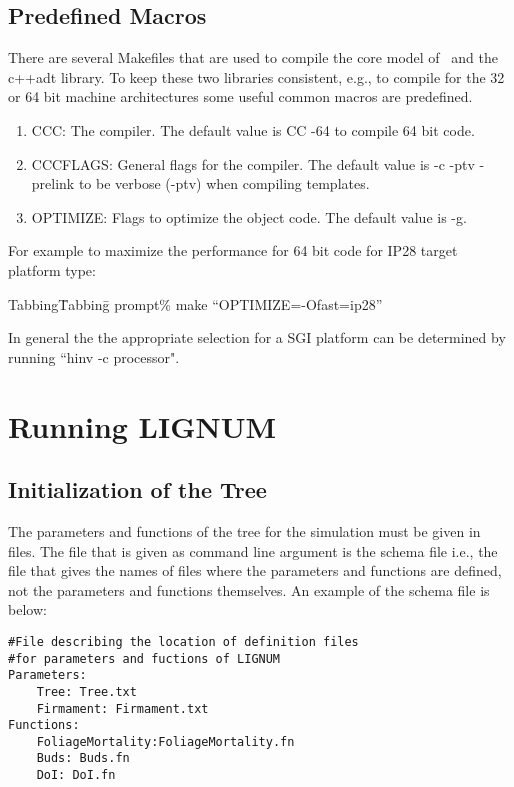 \subsection{Predefined Macros}

There are several Makefiles that are used to compile the core model of
\lignum\ and the c++adt library.   To  keep  these  two
libraries consistent,  e.g., to compile for  the 32 or  64 bit machine
architectures some useful common macros are predefined.

\begin{enumerate}
\item CCC: The compiler. The default value is CC -64 to compile 64 bit code.
\item CCCFLAGS: General flags for the compiler. The default value is 
 -c -ptv -prelink to be verbose (-ptv) when compiling templates.
\item OPTIMIZE: Flags to optimize the object code. The default value
is -g.
\end{enumerate}
For example to maximize the performance for 64 bit code for IP28 target platform type:
\begin{tabbing}
Tabbing\= Tabbing\=\kill 
\>\>prompt\% make ``OPTIMIZE=-Ofast=ip28''
\end{tabbing}

In general  the the  appropriate selection for  a SGI platform  can be
determined by running  ``hinv -c processor". 




\section{Running LIGNUM}

\subsection{Initialization of the Tree}

The parameters and functions of the tree for the simulation 
must be given in files. The file that is given as command 
line argument is the schema file i.e., the file that gives the 
names of files where the parameters and functions are defined, 
not the parameters and functions themselves. An example of the schema file
is below:

\begin{verbatim}
#File describing the location of definition files
#for parameters and fuctions of LIGNUM
Parameters:
    Tree: Tree.txt 
    Firmament: Firmament.txt
Functions:
    FoliageMortality:FoliageMortality.fn
    Buds: Buds.fn
    DoI: DoI.fn
\end{verbatim}

